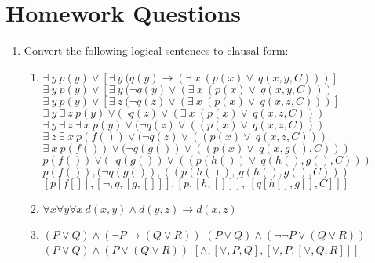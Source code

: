 \documentclass{article}
\begin{document}
\section*{Homework Questions}
\begin{enumerate}
\item Convert the following logical sentences to clausal form:
\begin{enumerate}
\item $\exists\ y\ p(y) \vee [\exists\ y\ (q(y) \rightarrow (\exists\ x\ (p(x) \vee\ q(x,y,C)))]$ \newline
$\exists\ y\ p(y) \vee [\exists\ y\ (\neg q(y) \vee (\exists\ x\ (p(x) \vee\ q(x,y,C)))]$ \newline
$\exists\ y\ p(y) \vee [\exists\ z\ (\neg q(z) \vee (\exists\ x\ (p(x) \vee\ q(x,z,C)))]$ \newline
$\exists\ y\ \exists\ z\ p(y) \vee (\neg q(z) \vee (\exists\ x\ (p(x) \vee\ q(x,z,C)))$ \newline
$\exists\ y\ \exists\ z\ \exists\ x\ p(y) \vee (\neg q(z) \vee ((p(x) \vee\ q(x,z,C)))$ \newline
$\exists\ z\ \exists\ x\ p(f()) \vee (\neg q(z) \vee ((p(x) \vee\ q(x,z,C)))$ \newline
$\exists\ x\ p(f()) \vee (\neg q(g()) \vee ((p(x) \vee\ q(x,g(),C)))$ \newline
$p(f()) \vee (\neg q(g()) \vee ((p(h()) \vee\ q(h(),g(),C)))$ \newline
$p(f()), (\neg q(g()) , ((p(h()) ,\ q(h(),g(),C)))$ \newline
$[p[f[]], [\neg, q,[g,[]]] , [p,[h,[]]] ,\ [q[h[],g[],C]]]$ \newline



\item $\forall x \forall y \forall x\ d(x,y) \wedge d(y,z) \rightarrow d(x,z)$
\item $( P \vee Q) \wedge (\neg P \rightarrow (Q \vee R))$ \newline
	$( P \vee Q) \wedge (\neg \neg P \vee (Q \vee R))$ \newline
	$( P \vee Q) \wedge (P \vee (Q \vee R))$ \newline
	$[\wedge, [\vee, P, Q], [\vee, P , [\vee, Q, R]]]$
	

\end{enumerate}
\end{enumerate}
\end{document}
